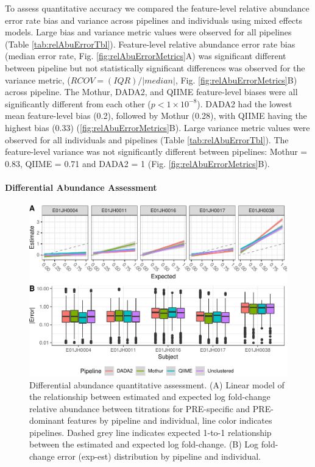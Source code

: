 \documentclass[linenumbers]{bmcart}
\begin{document}
To assess quantitative accuracy we compared the feature-level relative
abundance error rate bias  and variance across pipelines and individuals
using mixed effects models. Large bias and variance metric values were
observed for all pipelines (Table \ref{tab:relAbuErrorTbl}). Feature-level relative abundance error rate bias (median error rate, Fig.
\ref{fig:relAbuErrorMetrics}A) was significant different between pipeline but not statistically significant differences was observed for the variance metric, (\(RCOV=(IQR)/|median|\), Fig. \ref{fig:relAbuErrorMetrics}B) across pipeline. The Mothur, DADA2, and QIIME feature-level biases were all significantly different from each other (\(p < 1\times 10^{-8}\)). DADA2 had the lowest mean feature-level bias (0.2), followed by Mothur (0.28), with QIIME having the highest bias
(0.33) (\ref{fig:relAbuErrorMetrics}B). Large variance metric values
were observed for all individuals and pipelines (Table
\ref{tab:relAbuErrorTbl}). The feature-level variance was not
significantly different between pipelines: Mothur = 0.83, QIIME = 0.71
and DADA2 = 1 (Fig. \ref{fig:relAbuErrorMetrics}B).

\paragraph{Differential Abundance Assessment}
\begin{figure}
\centering
\includegraphics{logFCerror-1.pdf}
\caption{\label{fig:logFCerror} Differential abundance quantitative assessment. (A) Linear model of the relationship between
estimated and expected log fold-change relative abundance between titrations for PRE-specific and
PRE-dominant features by pipeline and individual, line color indicates
pipelines. Dashed grey line indicates expected 1-to-1 relationship
between the estimated and expected log fold-change. (B) Log fold-change
error (\textbar{}exp-est\textbar{}) distribution by pipeline and
individual.}
\end{figure}
\end{document}
